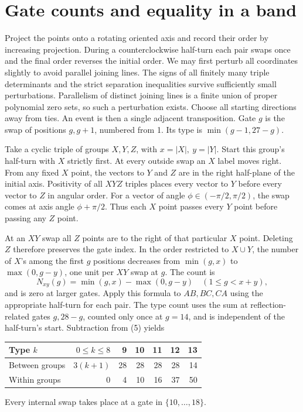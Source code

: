 \documentclass[11pt]{article}
\begin{document}
\section{Gate counts and equality in a band}
Project the points onto a rotating oriented axis and record their order by increasing projection. During a counterclockwise half-turn each pair swaps once and the final order reverses the initial order. We may first perturb all coordinates slightly to avoid parallel joining lines. The signs of all finitely many triple determinants and the strict separation inequalities survive sufficiently small perturbations. Parallelism of distinct joining lines is a finite union of proper polynomial zero sets, so such a perturbation exists. Choose all starting directions away from ties. An event is then a single adjacent transposition. Gate \(g\) is the swap of positions \(g,g+1\), numbered from 1. Its type is \(\min(g-1,27-g)\).

Take a cyclic triple of groups \(X,Y,Z\), with \(x=|X|,\ y=|Y|\). Start this group's half-turn with \(X\) strictly first. At every outside swap an \(X\) label moves right. From any fixed \(X\) point, the vectors to \(Y\) and \(Z\) are in the right half-plane of the initial axis. Positivity of all \(XYZ\) triples places every vector to \(Y\) before every vector to \(Z\) in angular order. For a vector of angle \(\phi\in(-\pi/2,\pi/2)\), the swap comes at axis angle \(\phi+\pi/2\). Thus each \(X\) point passes every \(Y\) point before passing any \(Z\) point.

At an \(XY\) swap all \(Z\) points are to the right of that particular \(X\) point. Deleting \(Z\) therefore preserves the gate index. In the order restricted to \(X\cup Y\), the number of \(X\)'s among the first \(g\) positions decreases from \(\min(g,x)\) to \(\max(0,g-y)\), one unit per \(XY\) swap at \(g\). The count is
\[
 N_{xy}(g)=\min(g,x)-\max(0,g-y) \quad(1\le g<x+y),
\]
and is zero at larger gates. Apply this formula to \(AB,BC,CA\) using the appropriate half-turn for each pair. The type count uses the sum at reflection-related gates \(g,28-g\), counted only once at \(g=14\), and is independent of the half-turn's start. Subtraction from (5) yields
\begin{center}
\begin{tabular}{lrrrrrr}
\toprule
Type \(k\)&\(0\le k\le8\)&9&10&11&12&13\\\midrule
Between groups&\(3(k+1)\)&28&28&28&28&14\\
Within groups&0&4&10&16&37&50\\\bottomrule
\end{tabular}
\end{center}
Every internal swap takes place at a gate in \(\{10,\ldots,18\}\).
\end{document}
